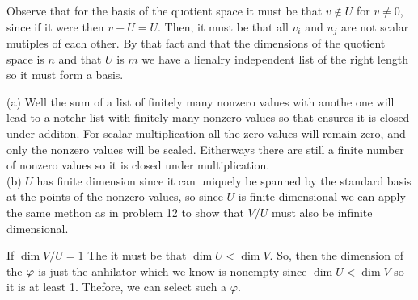 \documentclass[10pt, twocolumn]{article}
\begin{document}
\begin{q}[13]
    Observe that for the basis of the quotient space it must be that $ v \not\in U $ for $ v \neq 0 $, since if it were then $ v + U  = U $. 
    Then, it must be that all $ v_i $ and $ u_j $ are not scalar mutiples of each other. 
    By that fact and that the dimensions of the quotient space is $ n $ and that $ U $ is $ m $ we have a lienalry independent list of the right length so it must form a basis.
\end{q}
\begin{q}[14]
    (a) Well the sum of a list of finitely many nonzero values with anothe one will lead to a notehr list with finitely many nonzero values so that ensures it is closed under additon.
    For scalar multiplication all the zero values will remain zero, and only the nonzero values will be scaled. Eitherways there are still a finite number of nonzero values so it is closed under multiplication. \\
    (b) $ U $ has finite dimension since it can uniquely be spanned by the standard basis at the points of the nonzero values, so since $ U $ is finite dimensional we can apply the same methon as in problem 12 to show that $ V / U $ must also be infinite dimensional.
\end{q}
\begin{q}[16]
    If $ \dim V / U = 1 $ The it must be that $ \dim U < \dim V $. 
    So, then the dimension of the $ \null \varphi $ is just the anhilator which we know is nonempty since $ \dim U < \dim V $ so it is at least 1. 
    Thefore, we can select such a $ \varphi $. 
\end{q}
\end{document}
